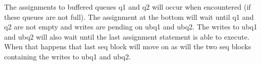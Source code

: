        The assignments to buffered queues q1 and q2 will occur when
        encountered (if these queues are not full). The assignment at the
        bottom will wait until q1 and q2 are not empty and writes are pending
        on ubq1 and ubq2. The writes to ubq1 and ubq2 will also wait until
        the last assignment statement is able to execute. When that happens
        that last seq block will move on as will the two seq blocks containing
        the writes to ubq1 and ubq2.


